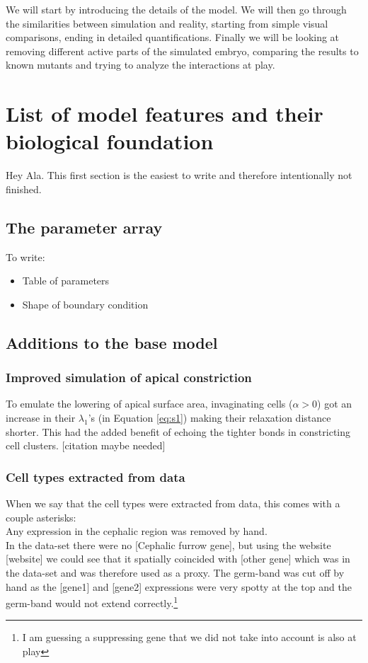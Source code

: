 We will start by introducing the details of the model. We will then go through the similarities between simulation and reality, starting from simple visual comparisons, ending in detailed quantifications. Finally we will be looking at removing different active parts of the simulated embryo, comparing the results to known mutants and trying to analyze the interactions at play. 
\section{List of model features and their biological foundation}

Hey Ala. This first section is the easiest to write and therefore intentionally not finished.
\subsection{The parameter array}
To write:
\begin{itemize}
    \item Table of parameters
    \item Shape of boundary condition
\end{itemize}
\subsection{Additions to the base model}
\subsubsection{Improved simulation of apical constriction}
To emulate the lowering of apical surface area, invaginating cells ($\alpha > 0$) got an increase in their $\lambda_1$'s (in Equation \ref{eq:s1}) making their relaxation distance shorter. This had the added benefit of echoing the tighter bonds in constricting cell clusters. [citation maybe needed]
\subsubsection{Cell types extracted from data}
When we say that the cell types were extracted from data, this comes with a couple asterisks:\\
Any expression in the cephalic region was removed by hand.\\
In the data-set there were no [Cephalic furrow gene], but using the website [website] we could see that it spatially coincided with [other gene] which was in the data-set and was therefore used as a proxy. 
The germ-band was cut off by hand as the [gene1] and [gene2] expressions were very spotty at the top and the germ-band would not extend correctly.\footnote{I am guessing a suppressing gene that we did not take into account is also at play} 

